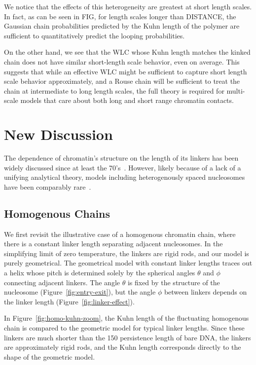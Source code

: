 \documentclass[%
 reprint,
superscriptaddress,
showpacs,preprintnumbers,
 amsmath,amssymb,
 aps,
 prl,
]{revtex4-1}
\begin{document}
We notice that the effects of this heterogeneity are greatest at short length
scales. In fact, as can be seen in FIG, for length scales longer than DISTANCE,
the Gaussian chain probabilities predicted by the Kuhn length of the polymer are
sufficient to quantitatively predict the looping probabilities.

On the other hand, we see that the WLC whose Kuhn length matches the kinked
chain does not have similar short-length scale behavior, even on average.
This suggests that while an effective WLC might be sufficient to capture short
length scale behavior approximately, and a Rouse chain will be sufficient to
treat the chain at intermediate to long length scales, %
the full theory is required for multi-scale models that care about both long
and short range chromatin contacts.


\section{New Discussion}

The dependence of chromatin's structure on the length of its linkers has been
widely discussed since at least the 70's~\cite{finch1976}.
However, likely because of a lack of a unifying analytical theory, models
including heterogenously spaced nucleosomes have been comparably
rare~\cite{woodcock1993,collepardo-guevara2014}.


\subsection{\label{sec:homo-chain}Homogenous Chains}

We first revisit the illustrative case of a homogenous chromatin chain, where
    there is a constant linker length separating adjacent nucleosomes.
In the simplifying limit of zero temperature, the linkers are rigid rods, and
    our model is purely geometrical.
The geometrical model with constant linker lengths traces out a helix whose
    pitch is determined solely by the spherical angles $\theta$ and $\phi$
    connecting adjacent linkers.
The angle $\theta$ is fixed by the structure of the nucleosome
    (Figure~\ref{fig:entry-exit}), but the angle $\phi$ between linkers depends
    on the linker length (Figure~\ref{fig:linker-effect}).

In Figure~\ref{fig:homo-kuhn-zoom}, the Kuhn length of the
    fluctuating homogenous chain is compared to the geometric model for
    typical linker lengths.
Since these linkers are much shorter than the \SI{150}{\basepair} persistence
    length of bare DNA, the linkers are approximately rigid rods, and the Kuhn
    length corresponds directly to the shape of the geometric model.
\end{document}
